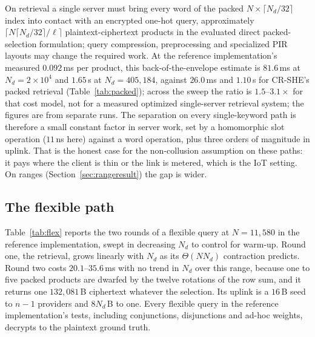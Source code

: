 \documentclass[a4paper,fleqn]{cas-sc}
\begin{document}
On retrieval a single server must bring every word of the packed
$N\times\lceil N_d/32\rceil$ index into contact with an encrypted one-hot
query, approximately $\lceil N\lceil N_d/32\rceil/\ell\rceil$
plaintext-ciphertext products in the evaluated direct packed-selection
formulation; query compression, preprocessing and specialized PIR layouts
may change the required work. At the reference implementation's measured
$0.092$\,ms per product, this back-of-the-envelope estimate is
$81.6$\,ms at
$N_d=2\times10^4$ and $1.65$\,s at $N_d=405{,}184$, against $26.0$\,ms and
$1.10$\,s for CR-SHE's packed retrieval (Table~\ref{tab:packed}); across the sweep the ratio is $1.5$--$3.1\times$ for that
cost model, not for a measured optimized single-server retrieval system;
the figures are from separate runs. The separation on every single-keyword path is therefore a small constant
factor in server work, set by a homomorphic slot operation ($11$\,ns here)
against a word operation, plus three orders of magnitude in uplink. That is the
honest case for the non-collusion assumption on these paths: it pays where the
client is thin or the link is metered, which is the IoT setting. On ranges
(Section~\ref{sec:rangeresult}) the gap is wider.

\subsection{The flexible path}
\label{sec:flexresult}
Table~\ref{tab:flex} reports the two rounds of a flexible query at
$N=11{,}580$ in the reference implementation, swept in decreasing $N_d$ to
control for warm-up. Round one, the retrieval, grows linearly with $N_d$ as
its $\Theta(NN_d)$ contraction predicts. Round two costs $20.1$--$35.6$\,ms
with no trend in $N_d$ over this range, because one to five packed products are
dwarfed by the twelve rotations of the row sum, and it returns one
$132{,}081$\,B ciphertext whatever the selection. Its uplink is a $16$\,B seed
to $n-1$ providers and $8N_d$\,B to one. Every flexible query in the reference implementation's tests, including
conjunctions, disjunctions and ad-hoc weights, decrypts to the plaintext ground
truth.
\end{document}
